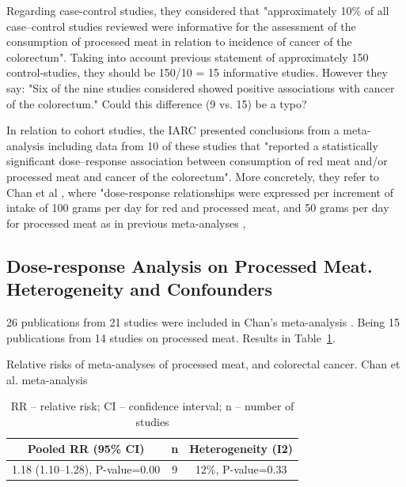 \documentclass{article}
\begin{document}
Regarding case-control studies, they considered that "approximately 10\% of all case–control studies reviewed were informative for the assessment of the consumption of processed meat in relation to incidence of cancer of the colorectum". Taking into account previous statement of approximately 150 control-studies, they should be 150/10 = 15 informative studies. However they say: "Six of the nine studies considered showed positive associations with cancer of the colorectum." Could this difference (9 vs. 15) be a typo?

In relation to cohort studies, the IARC presented conclusions from a meta-analysis including data from 10
of these studies that "reported a statistically significant dose–response association between consumption
of red meat and/or processed meat and cancer of the colorectum". More concretely, they refer to Chan et al \cite{chan}, where "dose-response relationships were expressed per increment of intake of 100 grams
per day for red and processed meat, and 50 grams per day for processed meat as in previous meta-analyses \cite{aicr}, \cite{sandhu}


\subsection{Dose-response Analysis on Processed Meat. Heterogeneity and Confounders}

26 publications from 21 studies were included in Chan's meta-analysis \cite{chan}. Being 15 publications from 14 studies on processed meat. Results in Table~\ref{tab:table}.

\begin{table}
 \caption{Relative risks of meta-analyses of processed meat, and colorectal cancer. Chan et al. meta-analysis}
  \centering

  \begin{center}
   \begin{tabular}{||c c c||}
   \hline
   Pooled RR (95\% CI)     & n     & Heterogeneity (I2)\\ [0.5ex]
   \hline\hline
     1.18 (1.10–1.28), P-value=0.00  & 9 & 12\%, P-value=0.33     \\ [1ex]
   \hline
  \end{tabular}

  \caption*{RR – relative risk; CI – confidence interval; n – number of studies}
  \end{center}

  \label{tab:table}
\end{table}
\end{document}
